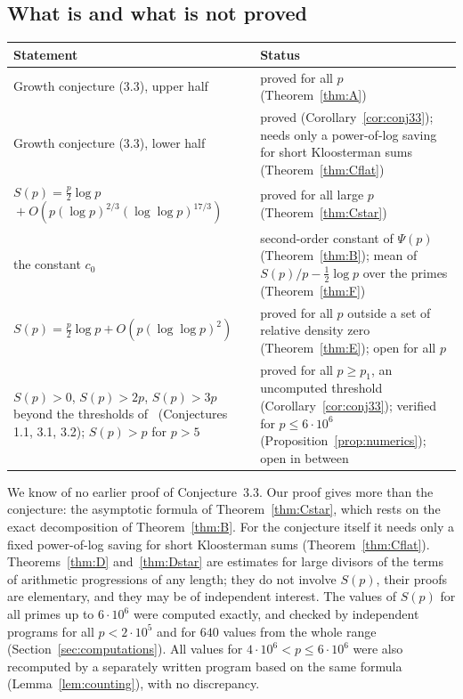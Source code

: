\subsection{What is and what is not proved}\label{subsec:status}\mbox{}

\begin{center}\small
\begin{tabular}{>{\raggedright\arraybackslash}p{}>{\raggedright\arraybackslash}p{}}
\toprule
Statement & Status\\
\midrule
Growth conjecture (3.3), upper half & proved for all $p$ (Theorem~\ref{thm:A})\\
\addlinespace
Growth conjecture (3.3), lower half & proved (Corollary~\ref{cor:conj33}); needs only a power-of-log saving for short Kloosterman sums (Theorem~\ref{thm:Cflat})\\
\addlinespace
$S(p)=\frac p2\log p$\newline\mbox{}\quad${}+O(p(\log p)^{2/3}(\log\log p)^{17/3})$ & proved for all large $p$ (Theorem~\ref{thm:Cstar})\\
\addlinespace
the constant $c_0$ & second-order constant of $\Psi(p)$ (Theorem~\ref{thm:B}); mean of $S(p)/p-\frac12\log p$ over the primes (Theorem~\ref{thm:F})\\
\addlinespace
$S(p)=\frac p2\log p+O(p(\log\log p)^2)$ & proved for all $p$ outside a set of relative density zero (Theorem~\ref{thm:E}); open for all $p$\\
\addlinespace
$S(p)>0$, $S(p)>2p$, $S(p)>3p$ beyond the thresholds of~\cite{b1} (Conjectures 1.1, 3.1, 3.2); $S(p)>p$ for $p>5$ & proved for all $p\ge p_1$, an uncomputed threshold (Corollary~\ref{cor:conj33}); verified for $p\le6\cdot10^6$ (Proposition~\ref{prop:numerics}); open in between\\
\bottomrule
\end{tabular}
\end{center}

We know of no earlier proof of Conjecture~3.3. Our proof gives more than the conjecture: the asymptotic formula of Theorem~\ref{thm:Cstar}, which rests on the exact decomposition of Theorem~\ref{thm:B}. For the conjecture itself it needs only a fixed power-of-log saving for short Kloosterman sums (Theorem~\ref{thm:Cflat}). Theorems~\ref{thm:D} and~\ref{thm:Dstar} are estimates for large divisors of the terms of arithmetic progressions of any length; they do not involve $S(p)$, their proofs are elementary, and they may be of independent interest. The values of $S(p)$ for all primes up to $6\cdot10^6$ were computed exactly, and checked by independent programs for all $p<2\cdot10^5$ and for $640$ values from the whole range (Section~\ref{sec:computations}). All values for $4\cdot10^6<p\le6\cdot10^6$ were also recomputed by a separately written program based on the same formula (Lemma~\ref{lem:counting}), with no discrepancy.

